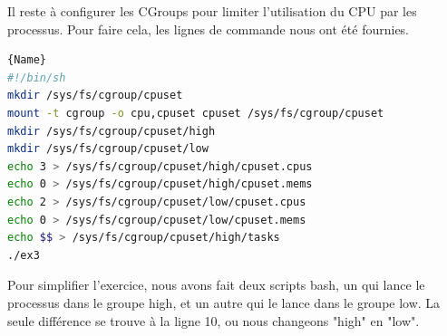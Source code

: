 \documentclass[
	a4paper, %
	10pt, %
]{CSUniSchoolLabReport}
\begin{document}
\newpage
Il reste \`a configurer les CGroups pour limiter l'utilisation du CPU par les processus. Pour faire cela, les lignes de commande nous ont été fournies.
\begin{lstlisting}[language=bash, firstnumber=1]{Name}
#!/bin/sh
mkdir /sys/fs/cgroup/cpuset
mount -t cgroup -o cpu,cpuset cpuset /sys/fs/cgroup/cpuset
mkdir /sys/fs/cgroup/cpuset/high
mkdir /sys/fs/cgroup/cpuset/low
echo 3 > /sys/fs/cgroup/cpuset/high/cpuset.cpus
echo 0 > /sys/fs/cgroup/cpuset/high/cpuset.mems
echo 2 > /sys/fs/cgroup/cpuset/low/cpuset.cpus
echo 0 > /sys/fs/cgroup/cpuset/low/cpuset.mems
echo $$ > /sys/fs/cgroup/cpuset/high/tasks
./ex3
\end{lstlisting}
Pour simplifier l'exercice, nous avons fait deux scripts bash, un qui lance le processus dans le groupe high, et un autre qui le lance dans le groupe low.
La seule diff\'erence se trouve \`a la ligne 10, ou nous changeons "high" en "low".
\end{document}
